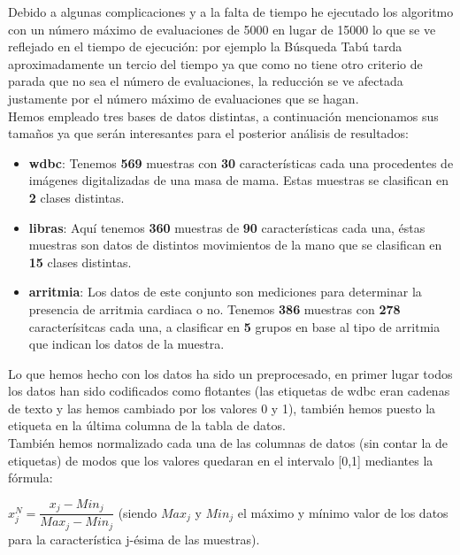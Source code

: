 \documentclass[10pt,a4paper]{article}
\begin{document}
Debido a algunas complicaciones y a la falta de tiempo he ejecutado los algoritmo con un número máximo de evaluaciones de 5000 en lugar de 15000 lo que se ve reflejado en el tiempo de ejecución: por ejemplo la Búsqueda Tabú tarda aproximadamente un tercio del tiempo ya que como no tiene otro criterio de parada que no sea el número de evaluaciones, la reducción se ve afectada justamente por el número máximo de evaluaciones que se hagan.\\

Hemos empleado tres bases de datos distintas, a continuación mencionamos sus tamaños ya que serán interesantes para el posterior análisis de resultados:\\

\begin{itemize}
\item \textbf{wdbc}: Tenemos \textbf{569} muestras con \textbf{30} características cada una procedentes de imágenes digitalizadas de una masa de mama. Estas muestras se clasifican en \textbf{2} clases distintas.
\item \textbf{libras}: Aquí tenemos \textbf{360} muestras de \textbf{90} características cada una, éstas muestras son datos de distintos movimientos de la mano que se clasifican en \textbf{15} clases distintas.
\item \textbf{arritmia}: Los datos de este conjunto son mediciones para determinar la presencia de arritmia cardiaca o no. Tenemos \textbf{386} muestras con \textbf{278} caracterísitcas cada una, a clasificar en \textbf{5} grupos en base al tipo de arritmia que indican los datos de la muestra.
\end{itemize}

Lo que hemos hecho con los datos ha sido un preprocesado, en primer lugar todos los datos han sido codificados como flotantes (las etiquetas de wdbc eran cadenas de texto y las hemos cambiado por los valores 0 y 1), también hemos puesto la etiqueta en la última columna de la tabla de datos.\\

También hemos normalizado cada una de las columnas de datos (sin contar la de etiquetas) de modos que los valores quedaran en el intervalo [0,1] mediantes la fórmula:\\

\begin{center}
$x_j^N = \dfrac{x_j - Min_j}{Max_j-Min_j}$ (siendo $Max_j$ y $Min_j$ el máximo y mínimo valor de los datos para la característica j-ésima de las muestras).
\end{center}
\end{document}
